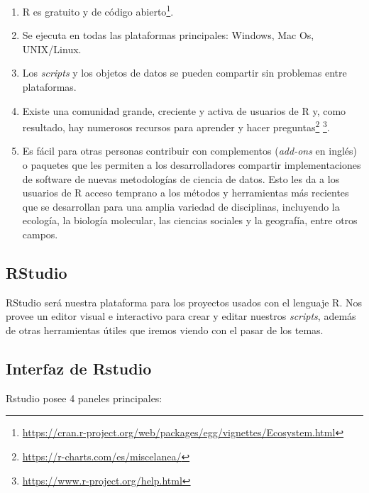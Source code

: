 \documentclass[
]{book}
\providecommand{\tightlist}{%
  \setlength{\itemsep}{0pt}\setlength{\parskip}{0pt}}
\begin{document}
\begin{enumerate}
\def\labelenumi{\arabic{enumi}.}
\tightlist
\item
  R es gratuito y de código abierto\footnote{\url{https://cran.r-project.org/web/packages/egg/vignettes/Ecosystem.html}}.
\item
  Se ejecuta en todas las plataformas principales: Windows, Mac Os, UNIX/Linux.
\item
  Los \emph{scripts} y los objetos de datos se pueden compartir sin problemas entre plataformas.
\item
  Existe una comunidad grande, creciente y activa de usuarios de R y, como resultado, hay numerosos recursos para aprender y hacer preguntas\footnote{\url{https://r-charts.com/es/miscelanea/}} \footnote{\url{https://www.r-project.org/help.html}}.
\item
  Es fácil para otras personas contribuir con complementos (\emph{add-ons} en inglés) o paquetes que les permiten a los desarrolladores compartir implementaciones de software de nuevas metodologías de ciencia de datos. Esto les da a los usuarios de R acceso temprano a los métodos y herramientas más recientes que se desarrollan para una amplia variedad de disciplinas, incluyendo la ecología, la biología molecular, las ciencias sociales y la geografía, entre otros campos.
\end{enumerate}

\subsection{RStudio}\label{rstudio}

RStudio será nuestra plataforma para los proyectos usados con el lenguaje R.
Nos provee un editor visual e interactivo para crear y editar nuestros \emph{scripts}, además de otras herramientas útiles que iremos viendo con el pasar de los temas.

\subsection{Interfaz de Rstudio}\label{interfaz-de-rstudio}

Rstudio posee 4 paneles principales:
\end{document}
